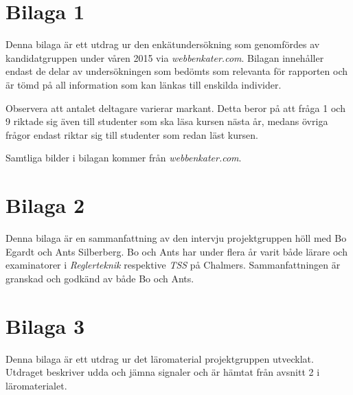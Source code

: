 \documentclass[12pt,a4paper,twoside,openright]{article}
\begin{document}
\newpage





\newpage

\appendix


\section{Bilaga 1}
\label{bil:1}
Denna bilaga är ett utdrag ur den enkätundersökning som genomfördes av
kandidatgruppen under våren 2015 via \textit{webbenkater.com}. Bilagan
innehåller endast de delar av undersökningen som bedömts som relevanta
för rapporten och är tömd på all information som kan länkas till
enskilda individer.

Observera att antalet deltagare varierar markant. Detta beror på att
 fråga 1 och 9 riktade sig även till studenter som ska läsa kursen nästa
år, medans övriga frågor endast riktar sig till studenter som redan läst
kursen.



Samtliga bilder i bilagan kommer från
\textit{webbenkater.com}.

\newpage

\section{Bilaga 2}
\label{bil:exam_intervju}
Denna bilaga är en sammanfattning av den intervju projektgruppen höll
med Bo Egardt och Ants Silberberg. Bo och Ants har under flera år
varit både lärare och examinatorer i \textit{Reglerteknik} respektive
\textit{TSS} på Chalmers. Sammanfattningen är granskad och godkänd av
både Bo och Ants.

\newpage

\section{Bilaga 3}
\label{bil:3}
Denna bilaga är ett utdrag ur det läromaterial projektgruppen
utvecklat. Utdraget beskriver udda och jämna signaler och är hämtat
från avsnitt 2 i läromaterialet.

\end{document}
